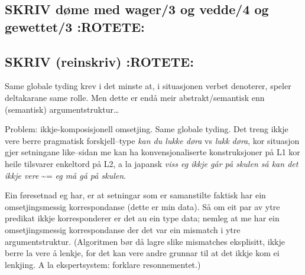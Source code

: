 \documentclass[11pt,a4paper,oneside,draft]{book}
\begin{document}
\begin{avm}
\end{avm}


\subsection{\textbf{SKRIV} døme med wager/3 og vedde/4 og gewettet/3 \textbf{:ROTETE:}}
\label{sec-3.12.5}


\subsection{\textbf{SKRIV} (reinskriv) \textbf{:ROTETE:}}
\label{sec-3.12.6}

Same globale tyding krev i det minste at, i situasjonen verbet
denoterer, speler deltakarane same rolle. Men dette er endå meir
abstrakt/semantisk enn (semantisk) argumentstruktur\ldots{}

Problem: ikkje-komposisjonell omsetjing. Same globale tyding. Det
treng ikkje vere berre pragmatisk forskjell--type \emph{kan du lukke døra}
vs \emph{lukk døra}, kor situasjon gjer setningane like--sidan me kan ha
konvensjonaliserte konstruksjoner på L1 kor heile tilsvarer enkeltord
på L2, a la japansk \emph{viss eg ikkje går på skulen så kan det ikkje vere} \~{}= \emph{eg må gå på skulen}. 

Ein føresetnad eg har, er at setningar som er samanstilte faktisk har
ein omsetjingsmessig korrespondanse (dette er min data). Så om eit par
av ytre predikat ikkje korresponderer er det au ein type data; nemleg
at me har ein omsetjingsmessig korrespondanse der det var ein mismatch
i ytre argumentstruktur. (Algoritmen bør då lagre slike mismatches
eksplisitt, ikkje berre la vere å lenkje, for det kan vere andre
grunnar til at det ikkje kom ei lenkjing. A la ekspertsystem: forklare
resonnementet.)
\end{document}
